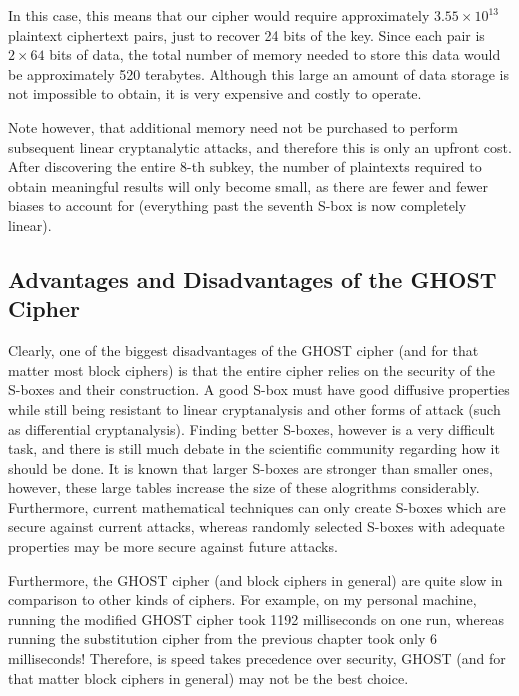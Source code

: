 \documentclass[12pt, a4paper, draft]{report}
\begin{document}
In this case, this means that our cipher would require approximately $3.55 \times 10^{13}$
plaintext ciphertext pairs, just to recover 24 bits of the key. Since each pair is
$2 \times 64$ bits of data, the total number of memory needed to store this data would be
approximately 520 terabytes. Although this large an amount of data storage is not impossible
to obtain, it is very expensive and costly to operate.

Note however, that additional memory need not be purchased to perform subsequent linear
cryptanalytic attacks, and therefore this is only an upfront cost. After discovering the
entire 8-th subkey, the number of plaintexts required to obtain meaningful results will only
become small, as there are fewer and fewer biases to account for (everything past the
seventh S-box is now completely linear).

\subsection{Advantages and Disadvantages of the GHOST Cipher}


Clearly, one of the biggest disadvantages of the GHOST cipher (and for that matter most
block ciphers) is that the entire cipher relies on the security of the S-boxes and their
construction. A good S-box must have good diffusive properties while still being resistant
to linear cryptanalysis and other forms of attack (such as differential cryptanalysis).
Finding better S-boxes, however is a very difficult task, and there is still much debate
in the scientific community regarding how it should be done. It is known that larger S-boxes
are stronger than smaller ones, however, these large tables increase the size of these
alogrithms considerably. Furthermore, current mathematical techniques can only create
S-boxes which are secure against current attacks, whereas randomly selected S-boxes with
adequate properties may be more secure against future attacks.

Furthermore, the GHOST cipher (and block ciphers in general) are quite slow in comparison to
other kinds of ciphers. For example, on my personal machine, running the modified GHOST
cipher took 1192 milliseconds on one run, whereas running the substitution cipher from the
previous chapter took only 6 milliseconds! Therefore, is speed takes precedence over
security, GHOST (and for that matter block ciphers in general) may not be the best choice.
\end{document}
